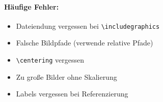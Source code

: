 \documentclass[a4paper,12pt]{article}
\begin{document}
\paragraph{Häufige Fehler:}
\begin{itemize}
  \item Dateiendung vergessen bei \texttt{\textbackslash includegraphics}
  \item Falsche Bildpfade (verwende relative Pfade)
  \item \texttt{\textbackslash centering} vergessen
  \item Zu große Bilder ohne Skalierung
  \item Labels vergessen bei Referenzierung
\end{itemize}
\end{document}
